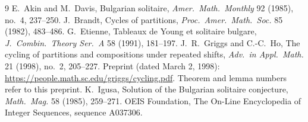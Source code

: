 \documentclass[11pt]{article}
\theoremstyle{definition}
\begin{document}
\begin{thebibliography}{9}
 E.~Akin and M.~Davis, Bulgarian solitaire, \emph{Amer.\ Math.\ Monthly} 92 (1985), no.~4, 237--250.
 J.~Brandt, Cycles of partitions, \emph{Proc.\ Amer.\ Math.\ Soc.} 85 (1982), 483--486.
 G.~Etienne, Tableaux de Young et solitaire bulgare, \emph{J.\ Combin.\ Theory Ser.~A} 58 (1991), 181--197.
 J.~R.~Griggs and C.-C.~Ho, The cycling of partitions and compositions under repeated shifts,
\emph{Adv.\ in Appl.\ Math.} 21 (1998), no.~2, 205--227. Preprint (dated March 2, 1998):
\url{https://people.math.sc.edu/griggs/cycling.pdf}. Theorem and lemma numbers refer to this preprint.
 K.~Igusa, Solution of the Bulgarian solitaire conjecture, \emph{Math.\ Mag.} 58 (1985), 259--271.
 OEIS Foundation, The On-Line Encyclopedia of Integer Sequences, sequence A037306.
\end{thebibliography}
\end{document}
